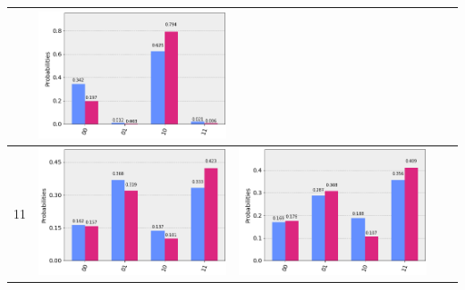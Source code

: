 \documentclass[11pt]{article}
\begin{document}
\begin{table}[h!]
\begin{tabular}{| c | c | c | c | c | }
\begin{minipage}{.215\textwidth}
      \end{minipage}
      &\begin{minipage}{.215\textwidth}
        \includegraphics[width=\linewidth]{img/one_qecc3_I10.png}
      \end{minipage}
      \\ \hline
      11 & 
      \begin{minipage}{.215\textwidth}
        \includegraphics[width=\linewidth]{img/one_qecc3_X11.png}
      \end{minipage}&
      \begin{minipage}{.215\textwidth}
        \includegraphics[width=\linewidth]{img/one_qecc3_Y11.png}

\end{minipage}
\end{tabular}
\end{table}
\end{document}
